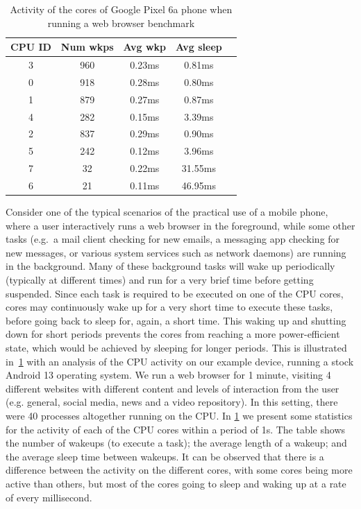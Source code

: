 \documentclass[conference]{IEEEtran}
\begin{document}
\begin{table}
\renewcommand{\arraystretch}{1.3}
\caption{Activity of the cores of Google Pixel 6a phone when running a web browser benchmark}
\label{tab:actweb}
\centering
\begin{tabular}{|c|c|c|c|c|}
\hline
\textbf{CPU ID} & \textbf{Num wkps} & \textbf{Avg wkp} &  \textbf{Avg sleep} \\
\hline
      3 &  960 &     0.23ms &        0.81ms \\      
      0 &    918 &      0.28ms &           0.80ms \\
      1 &    879 &       0.27ms &          0.87ms \\
      4 &    282 &       0.15ms &           3.39ms \\
      2 &  837 &       0.29ms &          0.90ms \\
      5 &    242 &       0.12ms &             3.96ms \\
      7 &     32 &       0.22ms &            31.55ms \\
      6 &     21 &       0.11ms &           46.95ms \\ 
      \hline
\end{tabular}
\end{table}

Consider one of the typical scenarios of the practical use of a mobile phone, where a user interactively runs a web browser in the foreground, while some other tasks (e.g.~a mail client checking for new emails, a messaging app checking for new messages, or various system services such as network daemons) are running in the background. Many of these background tasks will wake up periodically (typically at different times) and run for a very brief time before getting suspended. Since each task is required to be executed on one of the CPU cores, cores may continuously wake up for a very short time to execute these tasks, before going back to sleep for, again, a short time. This waking up and shutting down for short periods prevents the cores from reaching a more power-efficient state, which would be achieved by sleeping for longer periods. This is illustrated in~\cref{tab:actweb} with an analysis of the CPU activity on our example device, running a stock Android 13 operating system. We run a web browser for 1 minute, visiting 4 different websites with different content and levels of interaction from the user (e.g. general, social media, news and a video repository). In this setting, there were 40 processes altogether running on the CPU. In \cref{tab:actweb} we present some statistics for the activity of each of the CPU cores within a period of 1s. The table shows the number of wakeups (to execute a task); the average length of a wakeup; and the average sleep time between wakeups. It can be observed that there is a difference between the activity on the different cores, with some cores being more active than others, but most of the cores going to sleep and waking up at a rate of every millisecond. %
\end{document}
